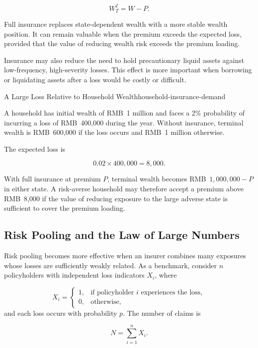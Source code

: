 \begin{equation}
W_T^{I}=W-P.
\label{eq:ch15-fully-insured-wealth}
\end{equation}

Full insurance replaces state-dependent wealth with a more stable wealth position. It can remain valuable when the premium exceeds the expected loss, provided that the value of reducing wealth risk exceeds the premium loading.

Insurance may also reduce the need to hold precautionary liquid assets against low-frequency, high-severity losses. This effect is more important when borrowing or liquidating assets after a loss would be costly or difficult.

\begin{example}{A Large Loss Relative to Household Wealth}{household-insurance-demand}

A household has initial wealth of RMB~1 million and faces
a 2\% probability of incurring a loss of RMB~400,000 during
the year. Without insurance, terminal wealth is RMB~600,000
if the loss occurs and RMB~1 million otherwise.

The expected loss is

$$
0.02\times 400{,}000=8{,}000.
$$

With full insurance at premium $P$, terminal wealth becomes RMB~$1{,}000{,}000-P$ in either state. A risk-averse household may therefore accept a premium above RMB~8,000 if the value of reducing exposure to the large adverse state is sufficient to cover the premium loading.

\end{example}


\subsection{Risk Pooling and the Law of Large Numbers}

Risk pooling becomes more effective when an insurer combines many exposures whose losses are sufficiently weakly related. As a benchmark, consider $n$ policyholders with independent loss indicators $X_i$, where

$$
X_i=
\begin{cases}
1, & \text{if policyholder } i \text{ experiences the loss},\\
0, & \text{otherwise},
\end{cases}
$$
and each loss occurs with probability $p$. The number of claims is

\begin{equation}
N=\sum_{i=1}^{n}X_i.
\label{eq:ch15-number-of-claims}
\end{equation}

